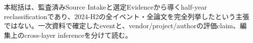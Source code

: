 \begin{claimboundary}
本総括は、監査済みSource Intakeと選定Evidenceから導くhalf-year reclassificationであり、2024-H2の全イベント・全論文を完全列挙したという主張ではない。一次資料で確定したeventと、vendor/project/authorの評価claim、編集上のcross-layer inferenceを分けて読む。\autocite{src-bcbc025369e3}
\end{claimboundary}
